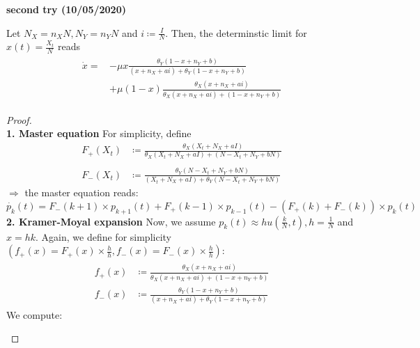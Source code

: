 \textbf{second try (10/05/2020)}
\begin{prop}\label{result_2}
	Let $N_X = n_X N, N_Y = n_Y N$ and $i \coloneqq \frac{I}{N}$. Then, the determinstic limit for $x\left(t\right) = \frac{X_t}{N}$ reads
	\begin{align}
	\begin{split}
	\dot{x} = &-\mu x\frac{\theta_Y(1-x+n_Y+b)}{(x+n_X+ai) + \theta_Y(1-x+n_Y+b)}\\
	\qquad&+ \mu \left(1-x\right)\frac{\theta_X (x+ n_X+ ai)}{\theta_X (x + n_X + ai) + (1-x + n_Y + b)}
	\end{split}
	\end{align}
\end{prop}
\begin{proof}\phantom{lol}\\
	\textbf{1. Master equation}\newline
	For simplicity, define
	\begin{align*}
	F_+ \left(X_t\right) &\coloneqq\frac{\theta_X (X_t + N_X + aI)}{\theta_X (X_t + N_X + aI) + (N-X_t + N_Y + bN)} \\
	&\\
	F_- \left(X_t\right) &\coloneqq\frac{\theta_Y(N-X_t + N_Y + bN)}{(X_t + N_X + aI) + \theta_Y(N-X_t + N_Y + bN)}
	\end{align*}
	$\Rightarrow$ the master equation reads:
	\begin{equation*}
	\dot{p_k}\left(t\right) = F_- \left(k+1\right)\times p_{k+1}\left(t\right) + F_+ \left(k-1\right)\times p_{k-1}\left(t\right) - \left(F_+\left(k\right) + F_-\left(k\right)\right)\times p_k\left(t\right)
	\end{equation*}
	\textbf{2. Kramer-Moyal expansion}\newline
	Now, we assume $p_k(t) \approx hu\left(\frac{k}{N}, t\right), h=\frac{1}{N}$ and $x = hk$.\newline
	Again, we define for simplicity $(f_+(x) = F_+(x) \times \frac{h}{h}, f_-(x) = F_-(x) \times \frac{h}{h})$:
	\begin{align}\label{def:daggers_2}
	\begin{split}
	f_+(x) &\coloneqq \frac{\theta_X (x+ n_X+ ai)}{\theta_X (x + n_X + ai) + (1-x + n_Y + b)}\\
	f_-(x) &\coloneqq \frac{\theta_Y(1-x+n_Y+b)}{(x+n_X+ai) + \theta_Y(1-x+n_Y+b)}
	\end{split}
	\end{align}
	We compute:
	\begin{align}\label{computation_2}
	\begin{split}

\end{split}
\end{align}
\end{proof}
